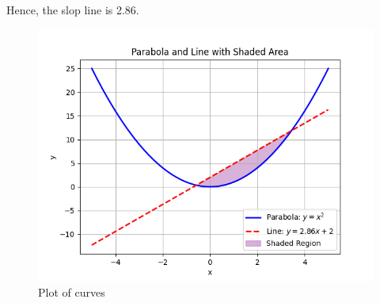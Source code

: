 \documentclass[journal]{IEEEtran}
\numberwithin{equation}{enumi}
\numberwithin{figure}{enumi}
\begin{document}
Hence, the slop line is 2.86.
\begin{figure}[h!]
   \centering
   \includegraphics[width=0.7\linewidth]{figs/Figure_1.png}
   \caption{Plot of curves}
   \label{stemplot}
\end{figure}
\end{document}
